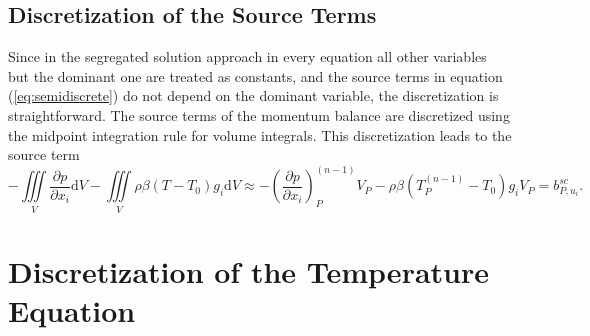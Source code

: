\subsection{Discretization of the Source Terms}

Since in the segregated solution approach in every equation all other variables but the dominant one are treated as constants, and the source terms in equation (\ref{eq:semidiscrete}) do not depend on the dominant variable, the discretization is straightforward. The source terms of the momentum balance are discretized using the midpoint integration rule for volume integrals. This discretization leads to the source term
\begin{displaymath}
  - \iiint\limits_V \frac{\partial p}{\partial x_i} \mathrm{d}V
  - \iiint\limits_V \rho \beta \left(T - T_0\right) g_i \mathrm{d}V
  \approx
  - \left(\frac{\partial p}{\partial x_i}\right)_P^{(n-1)} V_P
  - \rho \beta \left(T_P^{(n-1)} - T_0\right) g_i V_P
  = b_{P,u_i}^{sc}.
\end{displaymath}

\section{Discretization of the Temperature Equation}
\label{sec:discretetemperature}

